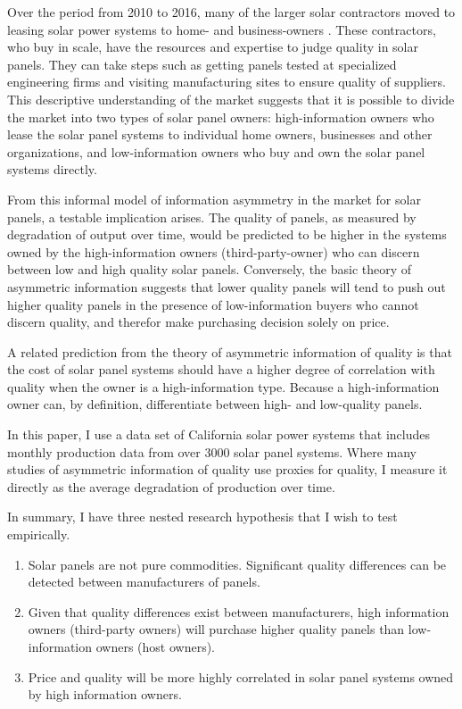 \documentclass[a4paper]{article}
\begin{document}
Over the period from 2010 to 2016, many of the larger solar contractors moved to leasing solar power systems to home- and business-owners \citep{mauritzen_cost_2017}. These contractors, who buy in scale, have the resources and expertise to judge quality in solar panels. They can take steps such as getting panels tested at specialized engineering firms and visiting manufacturing sites to ensure quality of suppliers. This descriptive understanding of the market suggests that it is possible to divide the market into two types of solar panel owners: high-information owners who lease the solar panel systems to individual home owners, businesses and other organizations, and low-information owners who buy and own the solar panel systems directly.

From this informal model of information asymmetry in the market for solar panels, a testable implication arises. The quality of panels, as measured by degradation of output over time, would be predicted to be higher in the systems owned by the high-information owners (third-party-owner) who can discern between low and high quality solar panels. Conversely, the basic theory of asymmetric information suggests that lower quality panels will tend to push out higher quality panels in the presence of low-information buyers who cannot discern quality, and therefor make purchasing decision solely on price.

A related prediction from the theory of asymmetric information of quality is that the cost of solar panel systems should have a higher degree of correlation with quality when the owner is a high-information type. Because a high-information owner can, by definition, differentiate between high- and low-quality panels.

In this paper, I use a data set of California solar power systems that includes monthly production data from over 3000 solar panel systems. Where many studies of asymmetric information of quality use proxies for quality, I measure it directly as the average degradation of production over time.

In summary, I have three nested research hypothesis that I wish to test empirically.

\begin{enumerate}
  \item Solar panels are not pure commodities. Significant quality differences can be detected between manufacturers of panels.
  \item Given that quality differences exist between manufacturers, high information owners (third-party owners) will purchase higher quality panels than low-information owners (host owners).
  \item Price and quality will be more highly correlated in solar panel systems owned by high information owners.
\end{enumerate}
\end{document}
